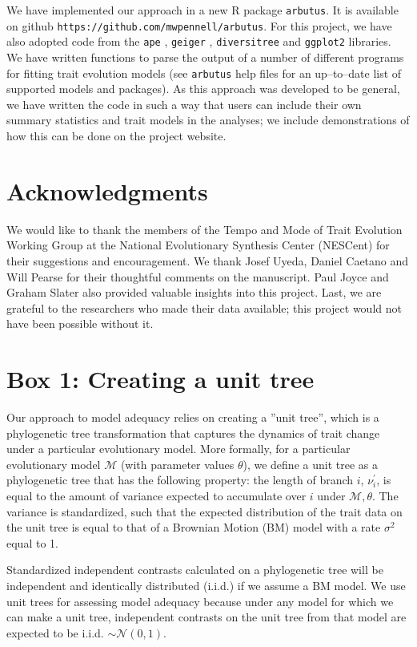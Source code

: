 \documentclass[a4paper,12pt]{article}
\begin{document}
We have implemented our approach in a new R package \texttt{arbutus}. It is available on github \texttt{https://github.com/mwpennell/arbutus}. For this project, we have also adopted code from the \texttt{ape} \citep{ape}, \texttt{geiger} \citep{geiger2}, \texttt{diversitree} \citep{FitzJohn2012} and \texttt{ggplot2} \citep{ggplot2} libraries. We have written functions to parse the output of a number of different programs for fitting trait evolution models (see \texttt{arbutus} help files for an up--to--date list of supported models and packages). As this approach was developed to be general, we have written the code in such a way that users can include their own summary statistics and trait models in the analyses; we include demonstrations of how this can be done on the project website.

\section{Acknowledgments}
We would like to thank the members of the Tempo and Mode of Trait Evolution Working Group at the National Evolutionary Synthesis Center (NESCent) for their suggestions and encouragement. We thank Josef Uyeda, Daniel Caetano and Will Pearse for their thoughtful comments on the manuscript. Paul Joyce and Graham Slater also provided valuable insights into this project. Last, we are grateful to the researchers who made their data available; this project would not have been possible without it.

\newpage
\section{Box 1: Creating a unit tree}

Our approach to model adequacy relies on creating a ''unit tree'', which is a phylogenetic tree transformation that captures the dynamics of trait change under a particular evolutionary model. More formally, for a particular evolutionary model $\mathcal{M}$ (with parameter values $\theta$), we define a unit tree as a phylogenetic tree that has the following property: the length of branch $i$, $\nu_i ^\prime$, is equal to the amount of variance expected to accumulate over $i$ under $\mathcal{M}, \theta$. The variance is standardized, such that the expected distribution of the trait data on the unit tree is equal to that of a Brownian Motion (BM) model with a rate $\sigma^2$ equal to 1. 

Standardized independent contrasts calculated on a phylogenetic tree will be independent and identically distributed (i.i.d.) if we assume a BM model. We use unit trees for assessing model adequacy because under any model for which we can make a unit tree, independent contrasts on the unit tree from that model are expected to be i.i.d. $\sim \mathcal{N}(0,1)$.
\end{document}
